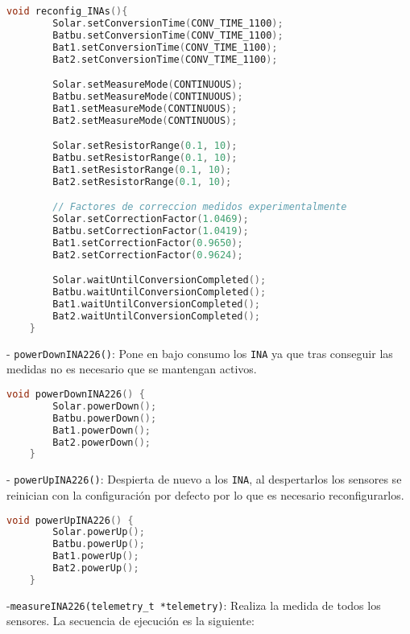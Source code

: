 \begin{lstlisting}[captionpos=b, caption={Codigo funcion reconfig\_INAs}, language=c++]
    void reconfig_INAs(){
        Solar.setConversionTime(CONV_TIME_1100);
        Batbu.setConversionTime(CONV_TIME_1100);
        Bat1.setConversionTime(CONV_TIME_1100);
        Bat2.setConversionTime(CONV_TIME_1100);

        Solar.setMeasureMode(CONTINUOUS);
        Batbu.setMeasureMode(CONTINUOUS);
        Bat1.setMeasureMode(CONTINUOUS);
        Bat2.setMeasureMode(CONTINUOUS);

        Solar.setResistorRange(0.1, 10);
        Batbu.setResistorRange(0.1, 10);
        Bat1.setResistorRange(0.1, 10);
        Bat2.setResistorRange(0.1, 10);

        // Factores de correccion medidos experimentalmente
        Solar.setCorrectionFactor(1.0469);
        Batbu.setCorrectionFactor(1.0419);
        Bat1.setCorrectionFactor(0.9650);
        Bat2.setCorrectionFactor(0.9624);

        Solar.waitUntilConversionCompleted();
        Batbu.waitUntilConversionCompleted();
        Bat1.waitUntilConversionCompleted();
        Bat2.waitUntilConversionCompleted();
    }
\end{lstlisting}

- \texttt{powerDownINA226()}: Pone en bajo consumo los \texttt{INA} ya que tras conseguir las medidas no es necesario que se mantengan activos.

\begin{lstlisting}[captionpos=b, caption={Codigo funcion powerDownINA226}, language=c++]
    void powerDownINA226() {
        Solar.powerDown();
        Batbu.powerDown();
        Bat1.powerDown();
        Bat2.powerDown();
    }
\end{lstlisting}


- \texttt{powerUpINA226()}: Despierta de nuevo a los \texttt{INA}, al despertarlos los sensores se reinician con la configuración por defecto por lo que es necesario reconfigurarlos.

\begin{lstlisting}[captionpos=b, caption={Codigo funcion powerUpINA226}, language=c++]
    void powerUpINA226() {
        Solar.powerUp();
        Batbu.powerUp();
        Bat1.powerUp();
        Bat2.powerUp();
    }
\end{lstlisting}

-\texttt{measureINA226(telemetry\_t *telemetry)}: Realiza la medida de todos los sensores. La secuencia de ejecución es la siguiente:

